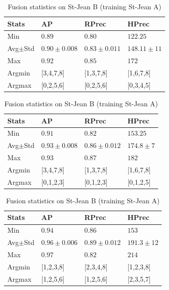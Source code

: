 \begin{table}
  \centering
  \caption{Fusion statistics on St-Jean B (training St-Jean A)}
  \label{tab:fusion_stats_B_A}

  \begin{tabular}{l l l l}
    \toprule
    Stats
    & AP
    & RPrec
    & HPrec \\
    \midrule
    Min          & $0.89$         & $0.80$         & $122.25$      \\
    Avg$\pm$Std & $0.90\pm0.008$ & $0.83\pm0.011$ & $148.11\pm11$ \\
    Max          & $0.92$         & $0.85$         & $172$         \\
    Argmin       & [3,4,7,8]   & [1,3,7,8]   & [1,6,7,8]  \\
    Argmax       & [0,2,5,6]   & [0,2,5,6]   & [0,3,4,5]  \\
    \bottomrule
  \end{tabular}

  \begin{tabular}{l l l l}
    \toprule
    Stats
    & AP
    & RPrec
    & HPrec \\
    \midrule
    Min          & $0.91$         & $0.82$         & $153.25$      \\
    Avg$\pm$Std & $0.93\pm0.008$ & $0.86\pm0.012$ & $174.8\pm7$ \\
    Max          & $0.93$         & $0.87$         & $182$         \\
    Argmin       & [3,4,7,8]   & [1,3,7,8]   & [1,6,7,8]  \\
    Argmax       & [0,1,2,3]   & [0,1,2,3]   & [0,1,2,5]  \\
    \bottomrule
  \end{tabular}

  \begin{tabular}{l l l l}
    \toprule
    Stats
    & AP
    & RPrec
    & HPrec \\
    \midrule
    Min          & $0.94$         & $0.86$         & $153$      \\
    Avg$\pm$Std & $0.96\pm0.006$ & $0.89\pm0.012$ & $191.3\pm12$ \\
    Max          & $0.97$         & $0.82$         & $214$         \\
    Argmin       & [1,2,3,8]   & [2,3,4,8]   & [1,2,3,8]  \\
    Argmax       & [1,2,5,6]   & [1,2,5,6]   & [2,3,5,7]  \\
    \bottomrule
  \end{tabular}


\end{table}
